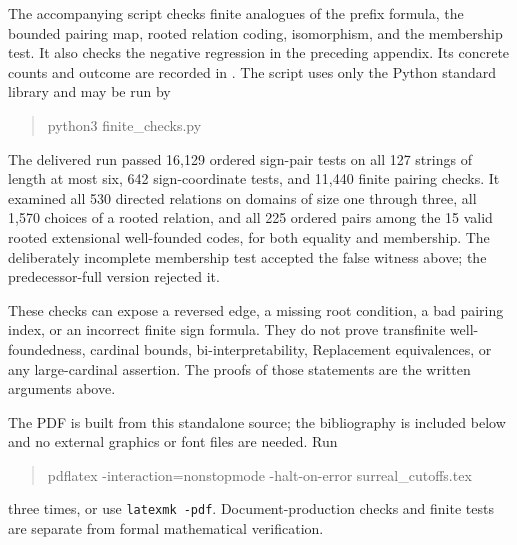 \documentclass[11pt,letterpaper]{article}
\theoremstyle{definition}
\theoremstyle{remark}
\begin{document}
The accompanying script  checks finite analogues of
the prefix formula, the bounded pairing map, rooted relation coding,
isomorphism, and the membership test. It also checks the negative regression
in the preceding appendix. Its concrete counts and outcome are recorded in
. The script uses only the Python standard
library and may be run by
\begin{quote}\ttfamily python3 finite\_checks.py\end{quote}

The delivered run passed 16,129 ordered sign-pair tests on all 127 strings
of length at most six, 642 sign-coordinate tests, and 11,440 finite pairing
checks. It examined all 530 directed relations on domains of size one
through three, all 1,570 choices of a rooted relation, and all 225 ordered
pairs among the 15 valid rooted extensional well-founded codes, for both
equality and membership. The deliberately incomplete membership test
accepted the false witness above; the predecessor-full version rejected it.

These checks can expose a reversed edge, a missing root condition, a bad
pairing index, or an incorrect finite sign formula. They do not prove
transfinite well-foundedness, cardinal bounds, bi-interpretability,
Replacement equivalences, or any large-cardinal assertion. The proofs of
those statements are the written arguments above.

The PDF is built from this standalone source; the bibliography is included
below and no external graphics or font files are needed. Run
\begin{quote}\ttfamily
pdflatex -interaction=nonstopmode -halt-on-error surreal\_cutoffs.tex
\end{quote}
three times, or use \texttt{latexmk -pdf}. Document-production checks and
finite tests are separate from formal mathematical verification.
\end{document}
